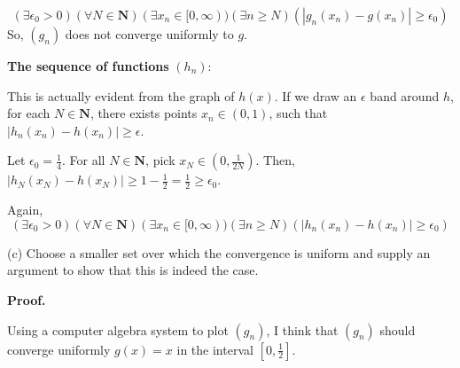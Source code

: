 \documentclass[10pt]{article}
\begin{document}
\begin{equation*}
( \exists \epsilon _{0}  >0)( \forall N\in \mathbf{N})( \exists x_{n} \in [ 0,\infty ))( \exists n\geq N)( |g_{n}( x_{n}) -g( x_{n}) |\geq \epsilon _{0})
\end{equation*}
So, $\displaystyle ( g_{n})$ does not converge uniformly to $\displaystyle g$.



\textbf{The sequence of functions} $\displaystyle ( h_{n})$:



This is actually evident from the graph of $\displaystyle h( x)$. If we draw an $\displaystyle \epsilon $ band around $\displaystyle h$, for each $\displaystyle N\in \mathbf{N}$, there exists points $\displaystyle x_{n} \in ( 0,1)$, such that $\displaystyle |h_{n}( x_{n}) -h( x_{n}) |\geq \epsilon $. 



Let $\displaystyle \epsilon _{0} =\frac{1}{4}$. For all $\displaystyle N\in \mathbf{N}$, pick $\displaystyle x_{N} \in \left( 0,\frac{1}{2N}\right)$. Then, $\displaystyle |h_{N}( x_{N}) -h( x_{N}) |\geq 1-\frac{1}{2} =\frac{1}{2} \geq \epsilon _{0}$.



Again, 
\begin{equation*}
( \exists \epsilon _{0}  >0)( \forall N\in \mathbf{N})( \exists x_{n} \in [ 0,\infty ))( \exists n\geq N)( |h_{n}( x_{n}) -h( x_{n}) |\geq \epsilon _{0})
\end{equation*}


(c) Choose a smaller set over which the convergence is uniform and supply an argument to show that this is indeed the case.



\textbf{Proof.}



Using a computer algebra system to plot $\displaystyle ( g_{n})$, I think that $\displaystyle ( g_{n})$ should converge uniformly $\displaystyle g( x) =x$ in the interval $\displaystyle \left[ 0,\frac{1}{2}\right]$. 





\begin{tikzpicture}[x=0.75pt,y=0.75pt,yscale=-1,xscale=1]





\end{tikzpicture}
\end{document}
